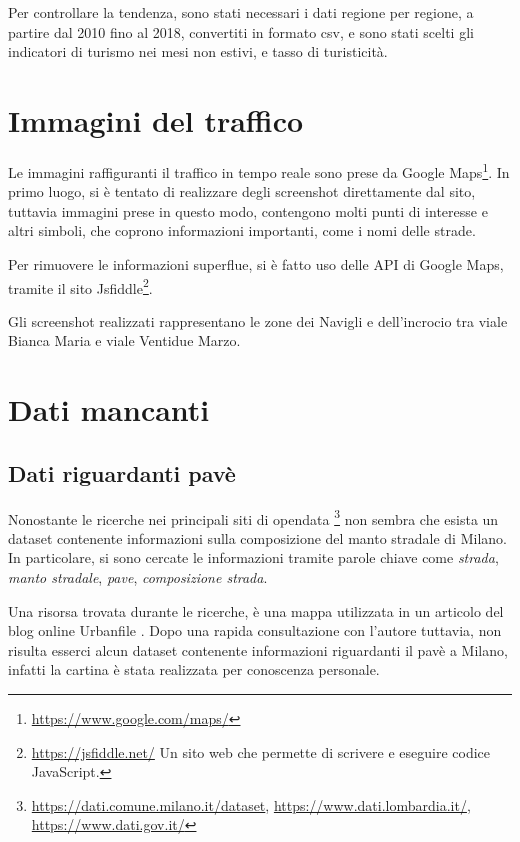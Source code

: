 \documentclass[a4paper,12pt]{report}
\newcommand{\quotestyle}[1]{\textit{#1}}
\begin{document}
Per controllare la tendenza, sono stati necessari i dati regione per regione, 
a partire dal 2010 fino al 2018, convertiti in formato csv, e sono stati scelti gli 
indicatori di turismo nei mesi non estivi, e tasso di turisticità. 

\section{Immagini del traffico}

Le immagini raffiguranti il traffico in tempo reale sono prese da Google 
Maps\footnote{\url{https://www.google.com/maps/}}. 
In primo luogo, si è tentato di realizzare degli screenshot direttamente dal sito, 
tuttavia immagini prese in questo modo, contengono molti punti di interesse e altri simboli, 
che coprono informazioni importanti, come i nomi delle strade.

Per rimuovere le informazioni superflue, si è fatto uso delle API di Google Maps, 
tramite il sito Jsfiddle\footnote{\url{https://jsfiddle.net/} Un sito web che permette di 
scrivere e eseguire codice JavaScript.}.

Gli screenshot realizzati rappresentano le zone dei Navigli e dell'incrocio tra viale 
Bianca Maria e viale Ventidue Marzo.

\section{Dati mancanti}

\subsection{Dati riguardanti pavè}

Nonostante le ricerche nei principali siti di opendata
\footnote{
    \url{https://dati.comune.milano.it/dataset}, 
    \url{https://www.dati.lombardia.it/},
    \url{https://www.dati.gov.it/}
    }
non sembra che esista un dataset contenente informazioni sulla composizione del 
manto stradale di Milano. 
In particolare, si sono cercate le informazioni tramite parole chiave come 
\quotestyle{strada}, \quotestyle{manto stradale}, \quotestyle{pave}, 
\quotestyle{composizione strada}.

Una risorsa trovata durante le ricerche, è una mappa utilizzata in un articolo del blog online 
Urbanfile \cite{URBANFILE:1}. 
Dopo una rapida consultazione con l'autore tuttavia, non risulta esserci alcun 
dataset contenente informazioni riguardanti il pavè a Milano, infatti la cartina è 
stata realizzata per conoscenza personale.
\end{document}
